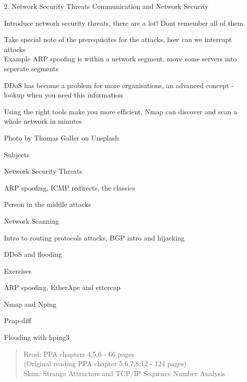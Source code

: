 \documentclass[Screen16to9,17pt]{foils}
\begin{document}
\mytitlepage
{2. Network Security Threats}
{Communication and Network Security \the\year}



\begin{list2}
\item Introduce network security threats, there are a lot! Dont remember all of them
\item Take special note of the prerequisites for the attacks, how can we interrupt attacks\\
Example ARP spoofing is within a network segment, move some servers into seperate segments \smiley
\item DDoS has become a problem for more organisations, an advanced concept - lookup when you need this information
\item Using the right tools make you more efficient, Nmap can discover and scan a whole network in minutes
\end{list2}

Photo by Thomas Galler on Unsplash



\begin{list1}
\item Subjects
\begin{list2}
\item Network Security Threats
\item ARP spoofing, ICMP redirects, the classics
\item Person in the middle attacks
\item Network Scanning
\item Intro to routing protocols attacks, BGP intro and hijacking
\item DDoS and flooding
\end{list2}
\item Exercises
\begin{list2}
\item ARP spoofing, EtherApe and ettercap
\item Nmap and Nping
\item Pcap-diff
\item Flooding with hping3
\end{list2}
\end{list1}



\begin{quote}
Read: PPA chapters 4,5,6 - 66 pages\\
(Original reading PPA chapter 5,6,7,8,12 - 124 pages)\\
Skim: Strange Attractors and TCP/IP Sequence Number Analysis
\end{quote}
\end{document}
